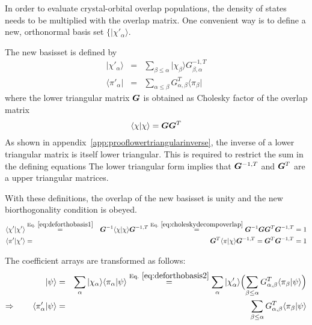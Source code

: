 \documentclass[11pt,a4paper]{report}
\begin{document}
In order to evaluate crystal-orbital overlap populations, the density
of states needs to be multiplied with the overlap matrix. One
convenient way is to define a new, orthonormal basis set
$\{|\chi'_\alpha\rangle$.

The new basisset is defined by
\begin{eqnarray}
|\chi'_\alpha\rangle&=&\sum_{\beta\le\alpha}|\chi_\beta\rangle G^{-1,T}_{\beta,\alpha}
\label{eq:deforthobasis1}
\\
\langle\pi'_\alpha|&=&\sum_{\alpha\le\beta} G^{T}_{\alpha,\beta}\langle\pi_\beta|
\label{eq:deforthobasis2}
\end{eqnarray}
where the lower triangular matrix $\bm{G}$ is obtained as Cholesky
factor of the overlap matrix
\begin{eqnarray}
\langle\chi|\chi\rangle=\bm{G} \bm{G}^T
\label{eq:choleskydecompoverlap}
\end{eqnarray}
As shown in appendix~\ref{app:prooflowertriangularinverse}, the
inverse of a lower triangular matrix is itself lower triangular. This
is required to restrict the sum in the defining equations
The lower triangular form implies that $\bm{G}^{-1,T}$ and
$\bm{G}^T$ are a upper triangular matrices.

With these definitions, the overlap of the new basisset is unity and
the new biorthogonality condition is obeyed.
\begin{eqnarray}
\langle\chi'|\chi'\rangle 
&\eqrel{eq:deforthobasis1}{=}&
\mat{G}^{-1}\langle\chi|\chi\rangle\mat{G}^{-1,T}
\eqrel{eq:choleskydecompoverlap}{=}
\mat{G}^{-1}\mat{G}\mat{G}^T
\mat{G}^{-1,T}=1 
\nonumber\\ 
%
\langle\pi'|\chi'\rangle
&=&\mat{G}^{T}\langle\pi|\chi\rangle \mat{G}^{-1,T}
=\mat{G}^{T}\mat{G}^{-1,T}=1
\end{eqnarray}

The coefficient arrays are transformed as follows:
\begin{eqnarray}
|\psi\rangle
&=&
\sum_\alpha|\chi_\alpha\rangle\langle\pi_\alpha|\psi\rangle
\eqrel{eq:deforthobasis2}{=}
\sum_\alpha|\chi'_\alpha\rangle
\Bigl(\sum_{\beta\le\alpha} G^T_{\alpha,\beta}\langle\pi_\beta|\psi\rangle\Bigr)
\nonumber\\
\Rightarrow\qquad
\langle\pi'_\alpha|\psi\rangle
&=&
\sum_{\beta\le\alpha} G^T_{\alpha,\beta}\langle\pi_\beta|\psi\rangle
\end{eqnarray}





\end{document}
